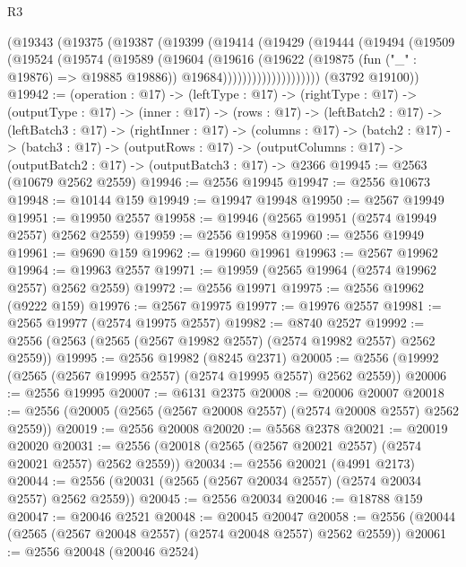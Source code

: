 \begin{lexlean}{R3}
\begin{coremodule}
                (@19343
                  (@19375
                    (@19387
                      (@19399
                        (@19414
                          (@19429
                            (@19444
                              (@19494
                                (@19509
                                  (@19524
                                    (@19574
                                      (@19589
                                        (@19604
                                          (@19616
                                            (@19622
                                              (@19875 (fun ("_" : @19876) => @19885 @19886))
                                              @19684))))))))))))))))))))
      (@3792 @19100))
@19942 := (operation : @17) ->
  (leftType : @17) ->
  (rightType : @17) ->
  (outputType : @17) ->
  (inner : @17) ->
  (rows : @17) ->
  (leftBatch2 : @17) ->
  (leftBatch3 : @17) ->
  (rightInner : @17) ->
  (columns : @17) ->
  (batch2 : @17) ->
  (batch3 : @17) ->
  (outputRows : @17) ->
  (outputColumns : @17) -> (outputBatch2 : @17) -> (outputBatch3 : @17) -> @2366
@19945 := @2563 (@10679 @2562 @2559)
@19946 := @2556 @19945
@19947 := @2556 @10673
@19948 := @10144 @159
@19949 := @19947 @19948
@19950 := @2567 @19949
@19951 := @19950 @2557
@19958 := @19946 (@2565 @19951 (@2574 @19949 @2557) @2562 @2559)
@19959 := @2556 @19958
@19960 := @2556 @19949
@19961 := @9690 @159
@19962 := @19960 @19961
@19963 := @2567 @19962
@19964 := @19963 @2557
@19971 := @19959 (@2565 @19964 (@2574 @19962 @2557) @2562 @2559)
@19972 := @2556 @19971
@19975 := @2556 @19962 (@9222 @159)
@19976 := @2567 @19975
@19977 := @19976 @2557
@19981 := @2565 @19977 (@2574 @19975 @2557)
@19982 := @8740 @2527
@19992 := @2556 (@2563 (@2565 (@2567 @19982 @2557) (@2574 @19982 @2557) @2562 @2559))
@19995 := @2556 @19982 (@8245 @2371)
@20005 := @2556 (@19992 (@2565 (@2567 @19995 @2557) (@2574 @19995 @2557) @2562 @2559))
@20006 := @2556 @19995
@20007 := @6131 @2375
@20008 := @20006 @20007
@20018 := @2556 (@20005 (@2565 (@2567 @20008 @2557) (@2574 @20008 @2557) @2562 @2559))
@20019 := @2556 @20008
@20020 := @5568 @2378
@20021 := @20019 @20020
@20031 := @2556 (@20018 (@2565 (@2567 @20021 @2557) (@2574 @20021 @2557) @2562 @2559))
@20034 := @2556 @20021 (@4991 @2173)
@20044 := @2556 (@20031 (@2565 (@2567 @20034 @2557) (@2574 @20034 @2557) @2562 @2559))
@20045 := @2556 @20034
@20046 := @18788 @159
@20047 := @20046 @2521
@20048 := @20045 @20047
@20058 := @2556 (@20044 (@2565 (@2567 @20048 @2557) (@2574 @20048 @2557) @2562 @2559))
@20061 := @2556 @20048 (@20046 @2524)

\end{coremodule}
\end{lexlean}
